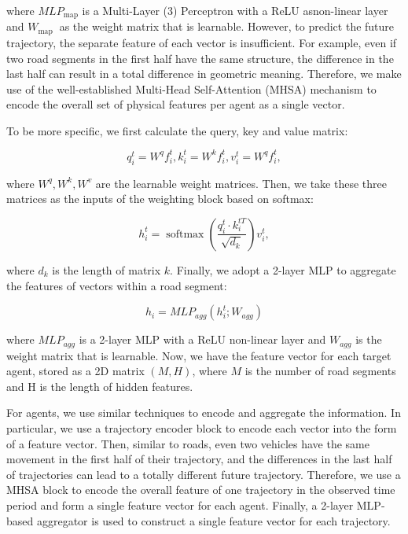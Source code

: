 where $MLP_{\text{map}}$ is a Multi-Layer (3) Perceptron with a ReLU asnon-linear layer and $W_{\text {map }}$ as the weight matrix that is learnable. However, to predict the future trajectory, the separate feature of each vector is insufficient. For example, even if two road segments in the first half have the same structure, the difference in the last half can result in a total difference in geometric meaning. Therefore, we make use of the well-established Multi-Head Self-Attention (MHSA) \cite{vaswani2017attention} mechanism to encode the overall set of physical features per agent as a single vector.

To be more specific, we first calculate the query, key and value matrix:

\begin{equation}
	q_i^t=W^q f_i^t, k_i^t=W^k f_i^t, v_i^t=W^q f_i^t,
\end{equation}

where $W^q, W^k, W^v$ are the learnable weight matrices. Then, we take these three matrices as the inputs of the weighting block based on softmax:

\begin{equation}
	h_i^t=\operatorname{softmax}\left(\frac{q_i^t \cdot k_i^{t T}}{\sqrt{d_k}}\right) v_i^t,
\end{equation}

where $d_k$ is the length of matrix $k$. Finally, we adopt a 2-layer MLP to aggregate the features of vectors within a road segment:

\begin{equation}
	h_i=MLP_{a g g}\left(h_i^t ; W_{a g g}\right)
\end{equation}

where $MLP_{a g g}$ is a 2-layer MLP with a ReLU non-linear layer and $W_{a g g}$ is the weight matrix that is learnable. Now, we have the feature vector for each target agent, stored as a 2D matrix $(M, H)$, where $M$ is the number of road segments and $\mathrm{H}$ is the length of hidden features. 

For agents, we use similar techniques to encode and aggregate the information. In particular, we use a trajectory encoder block to encode each vector into the form of a feature vector. Then, similar to roads, even two vehicles have the same movement in the first half of their trajectory, and the differences in the last half of trajectories can lead to a totally different future trajectory. Therefore, we use a MHSA block to encode the overall feature of one trajectory in the observed time period and form a single feature vector for each agent. Finally, a 2-layer MLP-based aggregator is used to construct a single feature vector for each trajectory.

